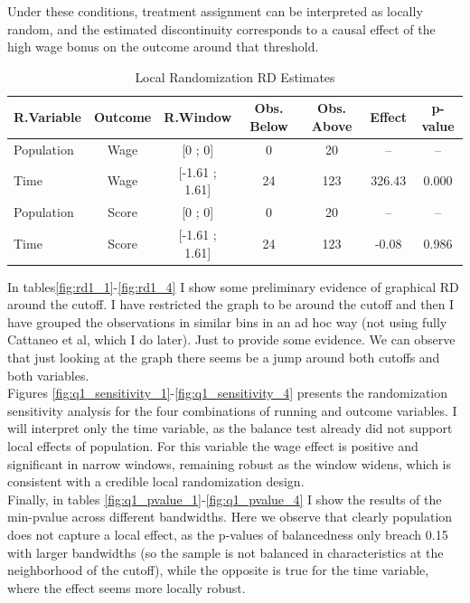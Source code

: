 \documentclass{article}
\begin{document}
Under these conditions, treatment assignment can be interpreted as locally random, and the estimated discontinuity corresponds to a causal effect of the high wage bonus on the outcome around that threshold.


\begin{table}[H]
\centering
\caption{Local Randomization RD Estimates}
\begin{tabular}{lcccccc}
\toprule
\textbf{R.Variable} & \textbf{Outcome} & \textbf{R.Window} & \textbf{Obs. Below} & \textbf{Obs. Above} & \textbf{Effect} & \textbf{p-value} \\
\midrule
Population & Wage  & [0 ; 0]             & 0   & 20  & --      & --     \\
Time       & Wage  & [-1.61 ; 1.61]      & 24  & 123 & 326.43  & 0.000  \\
Population & Score & [0 ; 0]             & 0   & 20  & --      & --     \\
Time       & Score & [-1.61 ; 1.61]      & 24  & 123 & -0.08   & 0.986  \\
\bottomrule
\end{tabular}
\label{table1_localrd}
\end{table}

In tables\ref{fig:rd1_1}-\ref{fig:rd1_4} I show some preliminary evidence of graphical RD around the cutoff. I have restricted the graph to be around the cutoff and then I have grouped the observations in similar bins in an ad hoc way (not using fully Cattaneo et al, which I do later). Just to provide some evidence. We can observe that just looking at the graph there seems be a jump around both cutoffs and both variables. \\

Figures \ref{fig:q1_sensitivity_1}-\ref{fig:q1_sensitivity_4} presents the randomization sensitivity analysis for the four combinations of running and outcome variables. I will interpret only the time variable, as the balance test already did not support local effects of population. For this variable the wage effect is positive and significant in narrow windows, remaining robust as the window widens, which is consistent with a credible local randomization design.  \\

Finally, in tables \ref{fig:q1_pvalue_1}-\ref{fig:q1_pvalue_4} I show the results of the min-pvalue across different bandwidths. Here we observe that clearly population does not capture a local effect, as the p-values of balancedness only breach 0.15 with larger bandwidths (so the sample is not balanced in characteristics at the neighborhood of the cutoff), while the opposite is true for the time variable, where the effect seems more locally robust. 
\end{document}
